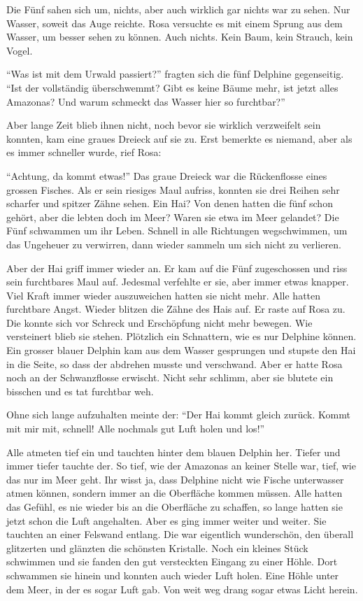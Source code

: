 Die Fünf sahen sich um, nichts, aber auch wirklich gar nichts war zu sehen. Nur Wasser, soweit das Auge reichte. Rosa versuchte es mit einem Sprung aus dem Wasser, um besser sehen zu können. Auch nichts. Kein Baum, kein Strauch, kein Vogel.

\enquote{Was ist mit dem Urwald passiert?} fragten sich die fünf Delphine gegenseitig. \enquote{Ist der vollständig überschwemmt? Gibt es keine Bäume mehr, ist jetzt alles Amazonas? Und warum schmeckt das Wasser hier so furchtbar?} 

Aber lange Zeit blieb ihnen nicht, noch bevor sie wirklich verzweifelt sein konnten, kam eine graues Dreieck auf sie zu. Erst bemerkte es niemand, aber als es immer schneller wurde, rief Rosa:

\enquote{Achtung, da kommt etwas!} Das graue Dreieck war die Rückenflosse eines grossen Fisches. Als er sein riesiges Maul aufriss, konnten sie drei Reihen sehr scharfer und spitzer Zähne sehen. Ein Hai? Von denen hatten die fünf schon gehört, aber die lebten doch im Meer? Waren sie etwa im Meer gelandet? Die Fünf schwammen um ihr Leben. Schnell in alle Richtungen wegschwimmen, um das Ungeheuer zu verwirren, dann wieder sammeln um sich nicht zu verlieren. 

Aber der Hai griff immer wieder an. Er kam auf die Fünf zugeschossen und riss sein furchtbares Maul auf. Jedesmal verfehlte er sie, aber immer etwas knapper. Viel Kraft immer wieder auszuweichen hatten sie nicht mehr. Alle hatten furchtbare Angst. Wieder blitzen die Zähne des Hais auf. Er raste auf Rosa zu. Die konnte sich vor Schreck und Erschöpfung nicht mehr bewegen. Wie versteinert blieb sie stehen. Plötzlich ein Schnattern, wie es nur Delphine können. Ein grosser blauer Delphin kam aus dem Wasser gesprungen und stupste den Hai in die Seite, so dass der abdrehen musste und verschwand. Aber er hatte Rosa noch an der Schwanzflosse erwischt. Nicht sehr schlimm, aber sie blutete ein bisschen und es tat furchtbar weh.

Ohne sich lange aufzuhalten meinte der: \enquote{Der Hai kommt gleich zurück. Kommt mit mir mit, schnell! Alle nochmals gut Luft holen und los!}

Alle atmeten tief ein und tauchten hinter dem blauen Delphin her. Tiefer und immer tiefer tauchte der. So tief, wie der Amazonas an keiner Stelle war, tief, wie das nur im Meer geht. Ihr wisst ja, dass Delphine nicht wie Fische unterwasser atmen können, sondern immer an die Oberfläche kommen müssen. Alle hatten das Gefühl, es nie wieder bis an die Oberfläche zu schaffen, so lange hatten sie jetzt schon die Luft angehalten. Aber es ging immer weiter und weiter. Sie tauchten an einer Felswand entlang. Die war eigentlich wunderschön, den überall glitzerten und glänzten die schönsten Kristalle. Noch ein kleines Stück schwimmen und sie fanden den gut versteckten Eingang zu einer Höhle. Dort schwammen sie hinein und konnten auch wieder Luft holen. Eine Höhle unter dem Meer, in der es sogar Luft gab. Von weit weg drang sogar etwas Licht herein.

